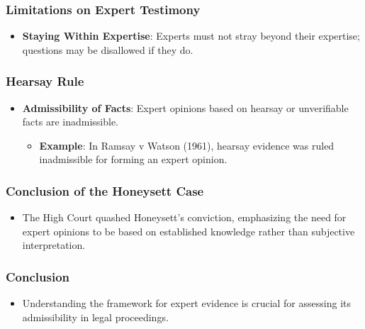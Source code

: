 \subsubsection{Limitations on Expert
Testimony}\label{limitations-on-expert-testimony}

\begin{itemize}
\tightlist
\item
  \textbf{Staying Within Expertise}: Experts must not stray beyond their
  expertise; questions may be disallowed if they do.
\end{itemize}

\subsubsection{Hearsay Rule}\label{hearsay-rule}

\begin{itemize}
\tightlist
\item
  \textbf{Admissibility of Facts}: Expert opinions based on hearsay or
  unverifiable facts are inadmissible.

  \begin{itemize}
  \tightlist
  \item
    \textbf{Example}: In Ramsay v Watson (1961), hearsay evidence was
    ruled inadmissible for forming an expert opinion.
  \end{itemize}
\end{itemize}

\subsubsection{Conclusion of the Honeysett
Case}\label{conclusion-of-the-honeysett-case}

\begin{itemize}
\tightlist
\item
  The High Court quashed Honeysett's conviction, emphasizing the need
  for expert opinions to be based on established knowledge rather than
  subjective interpretation.
\end{itemize}

\subsubsection{Conclusion}\label{conclusion-2}

\begin{itemize}
\tightlist
\item
  Understanding the framework for expert evidence is crucial for
  assessing its admissibility in legal proceedings.
\end{itemize}

